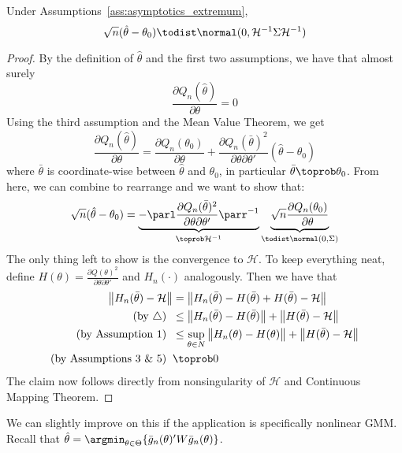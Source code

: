 \documentclass[10pt]{article}
\begin{document}
\begin{theorem}
	 Under Assumptions~\ref{ass:asymptotics_extremum}, \[\sqrt{n}(\hat{\theta} - \theta_0) \todist \normal(0,\mathcal{H}^{-1} \Sigma \mathcal{H}^{-1})\]
\end{theorem}
\begin{proof}
	By the definition of $\hat{\theta}$ and the first two assumptions, we have that almost surely\[\frac{\partial Q_n(\hat{\theta})}{\partial \theta} = 0\]Using the third assumption and the Mean Value Theorem, we get\[\frac{\partial Q_n(\hat{\theta})}{\partial \theta} = \frac{\partial Q_n(\theta_0)}{\partial \theta} + \frac{\partial Q_n(\bar{\theta})^2}{\partial \theta \partial \theta'}(\hat{\theta} - \theta_0)\]where $\bar{\theta}$ is coordinate-wise between $\hat{\theta}$ and $\theta_0$, in particular $\bar{\theta} \toprob \theta_0$. From here, we can combine to rearrange and we want to show that:\[\sqrt{n}(\hat{\theta} - \theta_0) = \underbrace{-\parl \frac{\partial Q_n(\bar{\theta})^2}{\partial\theta\partial \theta'}\parr^{-1}}_{\toprob \mathcal{H}^{-1}} \underbrace{\sqrt{n}\frac{\partial Q_n(\theta_0)}{\partial \theta}}_{\todist \normal(0,\Sigma)}\]The only thing left to show is the convergence to $\mathcal{H}$. To keep everything neat, define $H(\theta) = \frac{\partial Q(\theta)^2}{\partial \theta \partial \theta'}$ and $H_n(\cdot)$ analogously. Then we have that 
	\begin{align*}
		\big\|H_n(\bar{\theta}) - \mathcal{H}\big\| &= \big\| H_n(\bar{\theta}) - H(\bar{\theta}) + H(\bar{\theta}) - \mathcal{H}\big\| \\
		(\text{by } \triangle)\;\; &\le \big\| H_n(\bar{\theta}) - H(\bar{\theta})\big\| + \big\|H(\bar{\theta}) - \mathcal{H}\big\| \\
		(\text{by Assumption 1})\;\; &\le \sup_{\theta\in N} \big\| H_n(\theta) - H(\theta)\big\| + \big\|H(\bar{\theta}) - \mathcal{H}\big\| \\
		(\text{by Assumptions 3 \& 5})\;\; &\toprob 0
	\end{align*}
	The claim now follows directly from nonsingularity of $\mathcal{H}$ and Continuous Mapping Theorem.
\end{proof}

\begin{remark}
	We can slightly improve on this if the application is specifically nonlinear GMM. Recall that $\hat{\theta} = \argmin_{\theta\in\Theta} \{\bar{g}_n(\theta)' W \bar{g}_n(\theta)\}$.
\end{remark}
\end{document}
